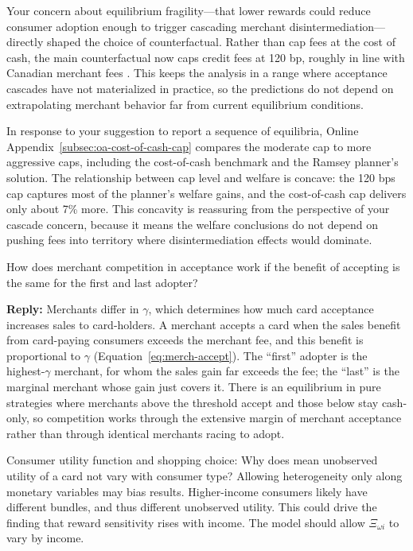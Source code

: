 \documentclass[main.tex]{subfiles}
\begin{document}
\begin{refsection}
Your concern about equilibrium fragility---that lower rewards could reduce consumer adoption enough to trigger cascading merchant disintermediation---directly shaped the choice of counterfactual.
Rather than cap fees at the cost of cash, the main counterfactual now caps credit fees at 120 bp, roughly in line with Canadian merchant fees \parencite{Innovation2023}.
This keeps the analysis in a range where acceptance cascades have not materialized in practice, so the predictions do not depend on extrapolating merchant behavior far from current equilibrium conditions.

In response to your suggestion to report a sequence of equilibria, Online Appendix~\ref{subsec:oa-cost-of-cash-cap} compares the moderate cap to more aggressive caps, including the cost-of-cash benchmark and the Ramsey planner's solution.
The relationship between cap level and welfare is concave: the 120 bps cap captures most of the planner's welfare gains, and the cost-of-cash cap delivers only about 7\% more.
This concavity is reassuring from the perspective of your cascade concern, because it means the welfare conclusions do not depend on pushing fees into territory where disintermediation effects would dominate.

\begin{refcommentnoclear}
How does merchant competition in acceptance work if the benefit of accepting is the same for the first and last adopter?
\end{refcommentnoclear}

\textbf{Reply:} Merchants differ in $\gamma$, which determines how much card acceptance increases sales to card-holders.
A merchant accepts a card when the sales benefit from card-paying consumers exceeds the merchant fee, and this benefit is proportional to $\gamma$ (Equation~\ref{eq:merch-accept}).
The ``first'' adopter is the highest-$\gamma$ merchant, for whom the sales gain far exceeds the fee; the ``last'' is the marginal merchant whose gain just covers it.
There is an equilibrium in pure strategies where merchants above the threshold accept and those below stay cash-only, so competition works through the extensive margin of merchant acceptance rather than through identical merchants racing to adopt.

\begin{refcommentnoclear}
Consumer utility function and shopping choice: Why does mean unobserved utility of a card not vary with consumer type?
Allowing heterogeneity only along monetary variables may bias results.
Higher-income consumers likely have different bundles, and thus different unobserved utility.
This could drive the finding that reward sensitivity rises with income.
The model should allow $\Xi_{\omega i}$ to vary by income.
\end{refcommentnoclear}


\end{refsection}
\end{document}
